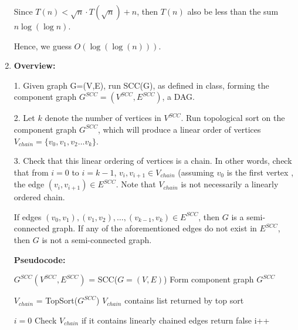 \documentclass[a4paper]{report}
\begin{document}
\begin{enumerate}
      Since $T(n) < \sqrt{n} \cdot T(\sqrt{n}) + n$, then $T(n)$ also be less than the sum $n \log(\log n)$. 

      Hence, we guess $O(\log(\log(n)))$.






    \par
    \bigskip

    \item 
      {\bf Overview:}

      1. Given graph G=(V,E), run SCC(G), as defined in class, 
      forming the component graph $G^{SCC} = (V^{SCC}, E^{SCC})$, a DAG. 

      2. Let $k$ denote the number of vertices in $V^{SCC}$. Run topological sort on the component graph $G^{SCC}$, 
      which will produce a linear order of vertices $V_{chain} = \{v_{0}, v_{1}, v_{2} \dots v_{k}\}$. 

      3. Check that this linear ordering of vertices is a chain. 
      In other words, check that from $i=0$ to $i=k-1$, $v_{i},v_{i+1} \in V_{chain}$ (assuming $v_{0}$ is the first vertex
      , the edge $(v_{i},v_{i+1}) \in E^{SCC}$.
      Note that $V_{chain}$ is not necessarily a linearly ordered chain.

      If edges $(v_{0}, v_{1}), (v_{1},v_{2}),\dots,(v_{k-1},v_{k}) \in E^{SCC}$, then $G$ is a semi-connected graph.
      If any of the aforementioned edges do not exist in $E^{SCC}$, then $G$ is not a semi-connected graph. 

      {\bf Pseudocode:}

      \begin{algorithmic}[1]

        \State $G^{SCC}(V^{SCC},E^{SCC})$ = SCC($G=(V,E)$)
        \Comment Form component graph $G^{SCC}$

        \State $V_{chain}$ = TopSort($G^{SCC}$)
        \Comment $V_{chain}$ contains list returned by top sort

        \State $i=0$
        \Comment Check $V_{chain}$ if it contains linearly chained edges
            \State return false
          \EndIf
          \State i++


\end{algorithmic}
\end{enumerate}
\end{document}
